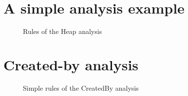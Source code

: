 \documentclass[main.tex]{subfiles}
\begin{document}
  \section{A simple analysis example}

  \begin{figure}[h]

  \caption{Rules of the Heap analysis}
  \end{figure}


  \section{Created-by analysis}

  \begin{figure}[h]
  \caption{Simple rules of the CreatedBy analysis}
  \end{figure}
\end{document}
